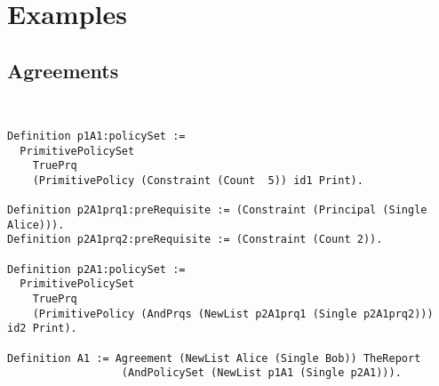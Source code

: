 \chapter{Examples}

\section{Agreements}


\lstset{language=Coq}
\begin{lstlisting}[frame=single, caption={Example 2.1},label={lst:example21}]


Definition p1A1:policySet :=
  PrimitivePolicySet
    TruePrq
    (PrimitivePolicy (Constraint (Count  5)) id1 Print).

Definition p2A1prq1:preRequisite := (Constraint (Principal (Single Alice))).
Definition p2A1prq2:preRequisite := (Constraint (Count 2)).

Definition p2A1:policySet :=
  PrimitivePolicySet
    TruePrq
    (PrimitivePolicy (AndPrqs (NewList p2A1prq1 (Single p2A1prq2))) id2 Print).

Definition A1 := Agreement (NewList Alice (Single Bob)) TheReport
                  (AndPolicySet (NewList p1A1 (Single p2A1))).

\end{lstlisting}                  